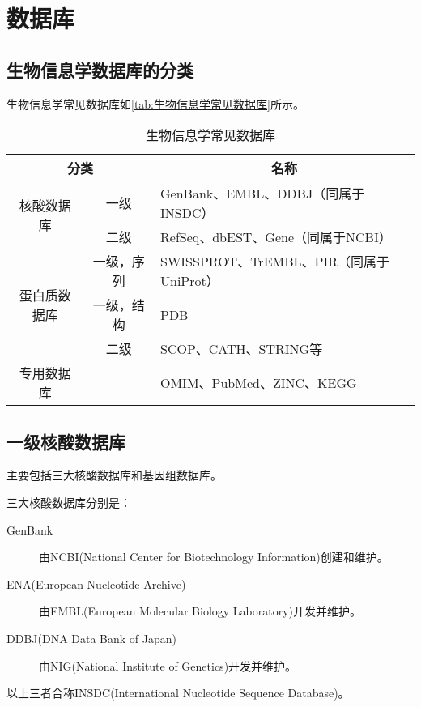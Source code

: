 \section{数据库}

\subsection{生物信息学数据库的分类}

生物信息学常见数据库如\autoref{tab:生物信息学常见数据库}所示。

\begin{table}[htbp]
	\begin{tabularx}{\textwidth}{|cc|X|}
		\hline
		\multicolumn{2}{|c|}{分类} & \multicolumn{1}{c|}{名称} \\ \hline
		\multicolumn{1}{|c|}{\multirow{2}{*}{核酸数据库}} & 一级 & GenBank、EMBL、DDBJ（同属于INSDC） \\ \cline{2-3}
		\multicolumn{1}{|c|}{} & 二级 & RefSeq、dbEST、Gene（同属于NCBI） \\ \hline
		\multicolumn{1}{|c|}{\multirow{3}{*}{蛋白质数据库}} & 一级，序列 & SWISSPROT、TrEMBL、PIR（同属于UniProt） \\ \cline{2-3}
		\multicolumn{1}{|c|}{} & 一级，结构 & PDB \\ \cline{2-3}
		\multicolumn{1}{|c|}{} & 二级 & SCOP、CATH、STRING等 \\ \hline
		\multicolumn{1}{|c|}{专用数据库} &  & OMIM、PubMed、ZINC、KEGG \\ \hline
	\end{tabularx}
	\caption{生物信息学常见数据库}
	\label{tab:生物信息学常见数据库}
\end{table}

\subsection{一级核酸数据库}

主要包括三大核酸数据库和基因组数据库。

三大核酸数据库分别是：

\begin{description}
	\item[GenBank] 由NCBI(National Center for Biotechnology Information)创建和维护。
	\item[ENA(European Nucleotide Archive)] 由EMBL(European Molecular Biology Laboratory)开发并维护。
	\item[DDBJ(DNA Data Bank of Japan)] 由NIG(National Institute of Genetics)开发并维护。
\end{description}
以上三者合称INSDC(International Nucleotide Sequence Database)。

